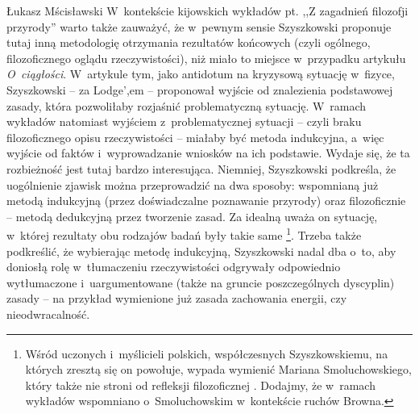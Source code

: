 \begin{artplenv}{Łukasz Mścisławski}
W~kontekście kijowskich wykładów pt. ,,Z zagadnień filozofji przyrody'' warto także zauważyć, że w~pewnym sensie Szyszkowski proponuje tutaj inną metodologię otrzymania rezultatów końcowych (czyli ogólnego, filozoficznego oglądu rzeczywistości), niż miało to miejsce w~przypadku artykułu \textit{O~ciągłości}. W~artykule tym, jako antidotum na kryzysową sytuację w~fizyce, Szyszkowski -- za Lodge',em -- proponował wyjście od znalezienia podstawowej zasady, która pozwoliłaby rozjaśnić problematyczną sytuację. W~ramach wykładów natomiast wyjściem z~problematycznej sytuacji -- czyli braku filozoficznego opisu rzeczywistości -- miałaby być metoda indukcyjna, a~więc wyjście od faktów i~wyprowadzanie wniosków na ich podstawie. Wydaje się, że ta rozbieżność jest tutaj bardzo interesująca. Niemniej, Szyszkowski podkreśla, że uogólnienie zjawisk można przeprowadzić na dwa sposoby: wspomnianą już metodą indukcyjną (przez doświadczalne poznawanie przyrody) oraz filozoficznie -- metodą dedukcyjną przez tworzenie zasad. Za idealną uważa on sytuację, w~której rezultaty obu rodzajów badań były takie same
\parencite[por. ][k. 212r-212v]{noauthor_noty_1917}%
 \footnote{Wśród uczonych i~myślicieli polskich, współczesnych Szyszkowskiemu, na których zresztą się on powołuje, wypada wymienić Mariana Smoluchowskiego, który także nie stroni od refleksji filozoficznej 
\parencite[por. np.][]{dziekan_zagadnienie_2017}. %
 Dodajmy, że w~ramach wykładów wspomniano o~Smoluchowskim w~kontekście ruchów Browna.}. Trzeba także podkreślić, że wybierając metodę indukcyjną, Szyszkowski nadal dba o~to, aby doniosłą rolę w~tłumaczeniu rzeczywistości odgrywały odpowiednio wytłumaczone i~uargumentowane (także na gruncie poszczególnych dyscyplin) zasady -- na przykład wymienione już zasada zachowania energii, czy nieodwracalność.


\end{artplenv}
